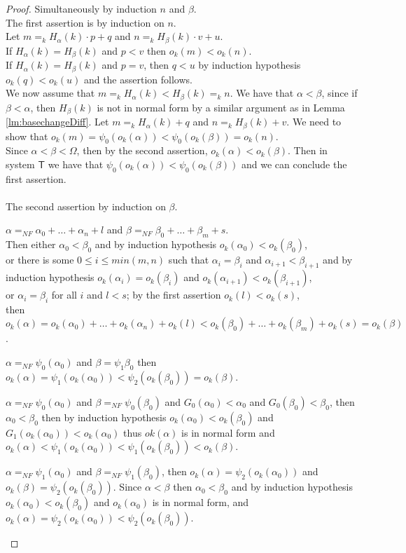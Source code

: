 \documentclass{amsart}
\theoremstyle{plain}
\theoremstyle{plain}
\newcommand\T{\mathsf{T}}
\newcommand{\Om}{{\Omega}}
\newcommand{\ok}{o_{k}}
\newcommand{\al}{{\alpha}}
\newcommand{\be}{{\beta}}
\begin{document}
\begin{proof}
Simultaneously by induction $n$ and $\be$. \medskip\\
The first assertion is by induction on $n$.\\
Let $m=_k H_\al(k)\cdot p +q$ and $n=_k H_\be(k) \cdot v + u$.\\
If $H_\al(k)=H_\be(k)$ and $p<v$ then $\ok(m)<\ok(n)$.\\
If $H_\al(k)=H_\be(k)$ and $p=v$, then $q<u$ by induction hypothesis $\ok(q)<\ok(u)$ and the assertion follows.\smallskip\\
We now assume that $m=_k H_\al(k)< H_\be(k)=_k n$. We have that $\al<\be$, since if $\be<\al$, then $H_\be(k)$ is not in normal form by a similar argument as in Lemma \ref{lm:basechangeDiff}.
Let $m =_{k} H_\al(k) + q$ and $n=_{k} H_\be(k) + v$. 
We need to show that 
$\ok(m)= \psi_0(\ok(\al))< \psi_0(\ok(\be))= \ok(n).$\\
Since $\al< \be<\Om$, then by the second assertion,  $\ok(\al)<\ok(\be)$.
Then in system $\T$ we have that $\psi_0(\ok(\al)) <\psi_0(\ok(\be))$
and we can conclude the first assertion.\medskip
\\
\\
The second assertion by induction on $\be$.
\begin{Cases}
    \item $\al =_{NF} \al_0 +\ldots +\al_n +l$  and $\be =_{NF} \be_0 + \ldots + \be_m + s$.\\
    Then either $\al_0<\be_0$ and by induction hypothesis $\ok(\al_0)<\ok(\be_0)$,\\
    or there is some $0 \leq i \leq min(m,n)$ such that $\al_i=\be_i$  and $\al_{i+1}< \be_{i+1}$ and by induction hypothesis $\ok(\al_i)=\ok(\be_i)$ and $\ok(\al_{i+1}) < \ok(\be_{i+1})$, \\
    or $\al_i=\be_i$ for all $i$ and $l<s$; by the first assertion $\ok(l)<\ok(s)$,\\
    then $\ok(\al) =\ok(\al_0)+\ldots + \ok(\al_n)+\ok(l) < \ok(\be_0)+\ldots+\ok(\be_m)+\ok(s) =\ok(\be)$. 
    
    \item $\al =_{NF} \psi_0(\al_0)$ and $\be =\psi_1{\be_0}  $ then 
    $\ok(\al) = \psi_1(\ok(\al_0)) < \psi_2(\ok(\be_0))= \ok(\be)$.
    
    \item $\al =_{NF} \psi_0(\al_0) $ and $\be =_{NF} \psi_0(\be_0)$ and $G_0(\al_0)<\al_0$ and $G_0(\be_0)<\be_0$, 
    then $\al_0 < \be_0$  then by induction hypothesis $\ok(\al_0)< \ok(\be_0)$ and
    $G_1(\ok(\al_0)) <\ok(\al_0)$
    thus $ok(\al)$ is in normal form and $\ok(\al)<\psi_1(\ok(\al_0) ) <\psi_1(\ok(\be_0) )<\ok(\be)$.
    
    \item $\al =_{NF} \psi_1(\al_0) $ and $\be =_{NF} \psi_1(\be_0)$, 
    then $\ok(\al) = \psi_2(\ok(\al_0))$ and $\ok(\be) = \psi_2(\ok(\be_0))$.
    Since $\al<\be$ then $\al_0<\be_0$ and by induction hypothesis $\ok(\al_0)<\ok(\be_0)$ and $\ok(\al_0)$ is in normal form, and $\ok(\al) = \psi_2(\ok(\al_0)) <\psi_2(\ok(\be_0))$.
\end{Cases}
\end{proof}
\end{document}
